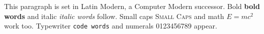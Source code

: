 \documentclass{article}
\begin{document}
This paragraph is set in Latin Modern, a Computer Modern successor.
Bold \textbf{bold words} and italic \textit{italic words} follow.
Small caps \textsc{Small Caps} and math $E = mc^2$ work too.
Typewriter \texttt{code words} and numerals 0123456789 appear.
\end{document}
